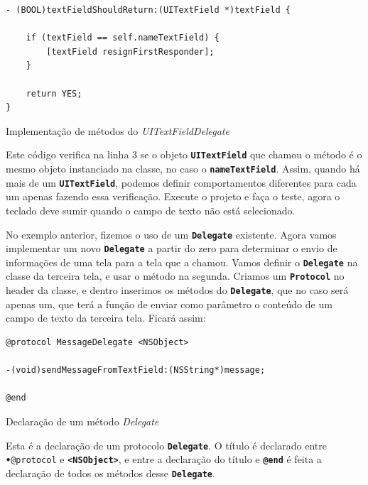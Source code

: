 \documentclass[a4paper,12pt,brazil,doubleside]{book}
\begin{document}
\begin{singlespace}
\begin{listing}[H]
\begin{verbatim}
- (BOOL)textFieldShouldReturn:(UITextField *)textField {
    
    if (textField == self.nameTextField) {
        [textField resignFirstResponder];
    }
    
    return YES;
}
\end{verbatim}
\caption{Implementação de métodos do \emph{UITextFieldDelegate}}
\end{listing}


Este código verifica na linha 3 se o objeto \texttt{\textbf{UITextField}} que chamou o método é o mesmo objeto instanciado na classe, no caso o \texttt{\textbf{nameTextField}}. Assim, quando há mais de um \texttt{\textbf{UITextField}}, podemos definir comportamentos diferentes para cada um apenas fazendo essa verificação. Execute o projeto e faça o teste, agora o teclado deve sumir quando o campo de texto não está selecionado.

No exemplo anterior, fizemos o uso de um \texttt{\textbf{Delegate}} existente. Agora vamos implementar um novo \texttt{\textbf{Delegate}} a partir do zero para determinar o envio de informações de uma tela para a tela que a chamou. Vamos definir o \texttt{\textbf{Delegate}} na classe da terceira tela, e usar o método na segunda. Criamos um \texttt{\textbf{Protocol}} no header da classe, e dentro inserimos os métodos do \texttt{\textbf{Delegate}}, que no caso será apenas um, que terá a função de enviar como parâmetro o conteúdo de um campo de texto da terceira tela. Ficará assim:

\begin{listing}[H]
\begin{verbatim}
@protocol MessageDelegate <NSObject>

-(void)sendMessageFromTextField:(NSString*)message;

@end
\end{verbatim}
\caption{Declaração de um método \emph{Delegate}}
\end{listing}


Esta é a declaração de um protocolo \texttt{\textbf{Delegate}}. O título é declarado entre \texttt{\textbf{•}{@protocol}} e \texttt{\textbf{<NSObject>}}, e entre a declaração do título e \texttt{\textbf{@end}} é feita a declaração de todos os métodos desse \texttt{\textbf{Delegate}}.


\end{singlespace}
\end{document}

